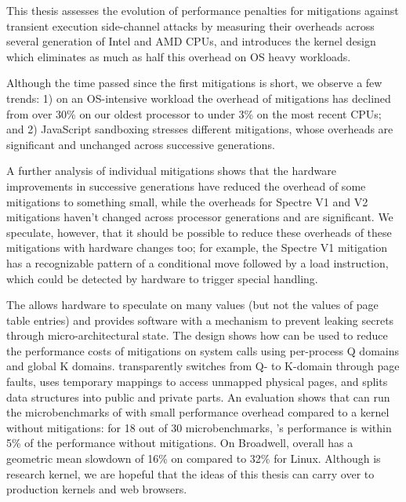 \label{s:concl}

This thesis assesses the evolution of performance penalties for
mitigations against transient execution side-channel attacks by
measuring their overheads across several generation of Intel and AMD
CPUs, and introduces the \sys kernel design which eliminates as much
as half this overhead on OS heavy workloads.

Although the time passed since the first mitigations is short,
we observe a few trends: 1) on an OS-intensive workload the
overhead of mitigations has declined from over 30\% on our oldest
processor to under 3\% on the most recent CPUs; and 2) JavaScript
sandboxing stresses different mitigations, whose overheads are
significant and unchanged across successive generations.

A further analysis of individual mitigations shows that the hardware
improvements in successive generations have reduced the overhead of
some mitigations to something small, while the overheads for Spectre
V1 and V2 mitigations haven't changed across processor generations and
are significant.  We speculate, however, that it should be possible to
reduce these overheads of these mitigations with hardware changes too;
for example, the Spectre V1 mitigation has a recognizable pattern of a
conditional move followed by a load instruction, which could be
detected by hardware to trigger special handling.

The \contract
allows hardware to speculate on many values (but not the values of
page table entries) and provides software with a mechanism to prevent
leaking secrets through micro-architectural state.  The \sys design
shows how \contract can be used to reduce the performance costs of
mitigations on system calls using per-process Q domains and global K
domains.  \sys transparently switches from Q- to K-domain through page
faults, uses temporary mappings to access unmapped physical pages, and
splits data structures into public and private parts.  An evaluation
shows that \sys can run the microbenchmarks of \bench with small
performance overhead compared to a kernel without mitigations: for
18 out of 30 \bench microbenchmarks, \sys's performance is within 5\%
of the performance without mitigations.
On Broadwell, \sys overall has a geometric mean slowdown of 16\% on \bench compared to 32\% for Linux.
Although \sys is research kernel, we are hopeful that the ideas of this thesis can carry over to production kernels and web browsers.
